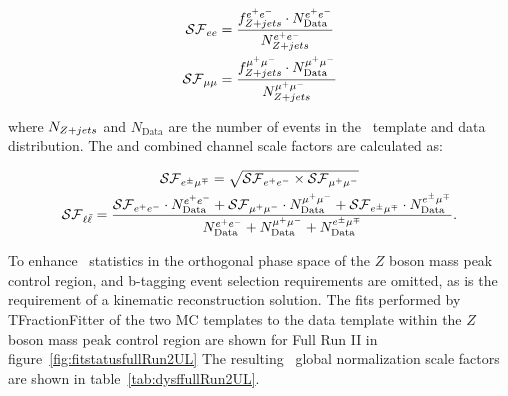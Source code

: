 \begin{linenomath*}
\begin{align}
\mathcal{SF}_{ee} &= \frac{f_{Z+jets}^{e^{+}e^{-}} \cdot N_\text{Data}^{e^{+}e^{-}}}{N_{Z+jets}^{e^{+}e^{-}}} \\
\mathcal{SF}_{\mu\mu} &= \frac{f_{Z+jets}^{\mu^{+}\mu^{-}} \cdot N_\text{Data}^{\mu^{+}\mu^{-}}}{N_{Z+jets}^{\mu^{+}\mu^{-}}}
\end{align}
\end{linenomath*}
where $N_{Z+jets}$ and $N_\text{Data}$ are the number of events in the \zjets\ template and data distribution.
The \emu and combined channel scale factors are calculated as:
\begin{linenomath*}
\begin{gather}
\mathcal{SF}_{e^{\pm}\mu^{\mp}} = \sqrt{\mathcal{SF}_{e^{+}e^{-}} \times \mathcal{SF}_{\mu^{+}\mu^{-}}} \\
\mathcal{SF}_{\ell \bar{\ell}} = \frac{\mathcal{SF}_{e^{+}e^{-}} \cdot N_\text{Data}^{e^{+}e^{-}} + \mathcal{SF}_{\mu^{+}\mu^{-}} \cdot N_\text{Data}^{\mu^{+}\mu^{-}} + \mathcal{SF}_{e^{\pm}\mu^{\mp}} \cdot N_\text{Data}^{e^{\pm}\mu^{\mp}}}{N_\text{Data}^{e^{+}e^{-}} + N_\text{Data}^{\mu^{+}\mu^{-}} + N_\text{Data}^{e^{\pm}\mu^{\mp}}}.
\end{gather}
\end{linenomath*}
To enhance \zjets\ statistics in the orthogonal phase space of the $Z$ boson mass peak control region, \MET and b-tagging event selection requirements are omitted, as is the requirement of a kinematic reconstruction solution.
The fits performed by TFractionFitter of the two MC templates to the data template within the $Z$ boson mass peak control region are shown for Full Run II in figure~\ref{fig:fitstatusfullRun2UL}
The resulting \zjets\ global normalization scale factors are shown in table~\ref{tab:dysffullRun2UL}.


